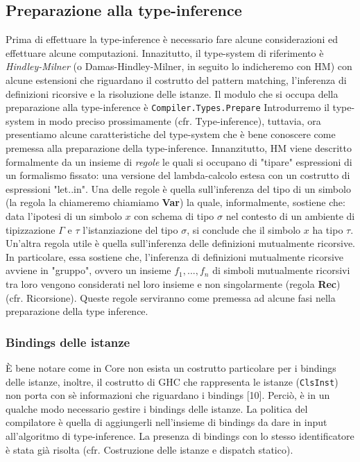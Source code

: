\documentclass[10pt,a4paper]{article}
\begin{document}
\subsection{Preparazione alla type-inference}
Prima di effettuare la type-inference è necessario fare alcune considerazioni ed effettuare alcune computazioni.
Innazitutto, il type-system di riferimento è \textit{Hindley-Milner} (o Damas-Hindley-Milner, in seguito lo indicheremo con HM)
con alcune estensioni che riguardano il costrutto del pattern matching, l'inferenza di definizioni ricorsive e la
risoluzione delle istanze. Il modulo che si occupa della preparazione alla type-inference è \texttt{Compiler.Types.Prepare}
Introdurremo il type-system in modo preciso prossimamente (cfr. Type-inference), tuttavia, ora presentiamo alcune
caratteristiche del type-system che è bene conoscere come premessa alla preparazione della type-inference.
Innanzitutto, HM viene descritto formalmente da un insieme di \textit{regole} le quali si occupano di "tipare"
espressioni di un formalismo fissato: una versione del lambda-calcolo estesa con un costrutto di espressioni "let..in".
Una delle regole è quella sull'inferenza del tipo di un simbolo (la regola la chiameremo chiamiamo \textbf{Var})
la quale, informalmente, sostiene che: data l'ipotesi di un simbolo $ x $ con schema di tipo $ \sigma $ nel contesto di
un ambiente di tipizzazione $ \Gamma $ e $ \tau $ l'istanziazione del tipo $ \sigma $, si conclude che il simbolo
$ x $ ha tipo $ \tau $.
Un'altra regola utile è quella
sull'inferenza delle definizioni mutualmente ricorsive. In particolare, essa sostiene che, l'inferenza di definizioni
mutualmente ricorsive avviene in "gruppo", ovvero un insieme $ {f_1, ..., f_n} $ di simboli mutualmente ricorsivi
tra loro vengono considerati nel loro insieme e non singolarmente (regola \textbf{Rec}) (cfr. Ricorsione).
Queste regole serviranno come premessa ad alcune fasi nella preparazione della type inference.

\subsubsection{Bindings delle istanze}
\`E bene notare come in Core non esista un costrutto particolare per i bindings delle istanze, inoltre, il
costrutto di GHC che rappresenta le istanze (\texttt{ClsInst}) non porta con sè informazioni che riguardano i
bindings [10].
Perciò, è in un qualche modo necessario gestire i bindings delle istanze. La politica del compilatore è quella di
aggiungerli nell'insieme di bindings da dare in input all'algoritmo di type-inference. La presenza di bindings con lo
stesso identificatore è stata già risolta (cfr. Costruzione delle istanze e dispatch statico).
\end{document}
